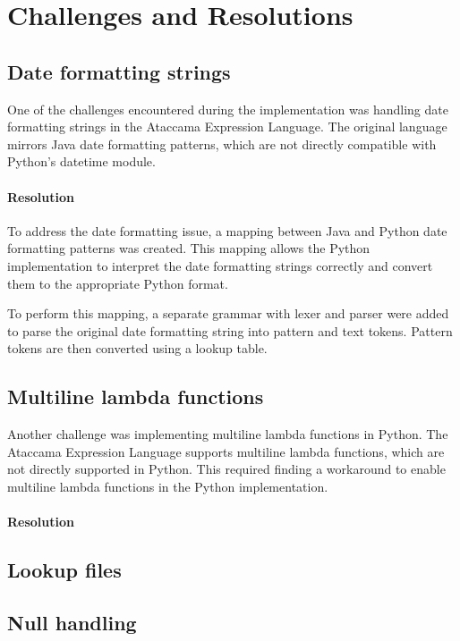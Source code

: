 \section{Challenges and Resolutions}

\subsection{Date formatting strings}

One of the challenges encountered during the implementation was handling date formatting strings in the Ataccama Expression Language. The original language mirrors Java date formatting patterns, which are not directly compatible with Python’s datetime module. \cite{noauthor_datetimeformatter_nodate}

\paragraph{Resolution}

To address the date formatting issue, a mapping between Java and Python date formatting patterns was created. This mapping allows the Python implementation to interpret the date formatting strings correctly and convert them to the appropriate Python format.

To perform this mapping, a separate grammar with lexer and parser were added to parse the original date formatting string into pattern and text tokens. Pattern tokens are then converted using a lookup table.

\subsection{Multiline lambda functions}

Another challenge was implementing multiline lambda functions in Python. The Ataccama Expression Language supports multiline lambda functions, which are not directly supported in Python. This required finding a workaround to enable multiline lambda functions in the Python implementation.

\paragraph{Resolution}



\subsection{Lookup files}

\subsection{Null handling}

